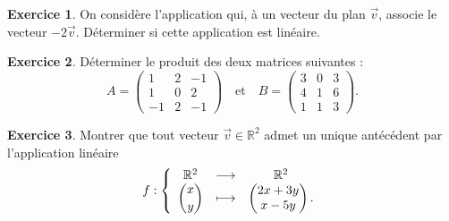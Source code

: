 \documentclass{article}
\theoremstyle{definition}
\newtheorem{exercice}{Exercice}
\begin{document}
\begin{exercice}
    On considère l'application qui, à un vecteur du plan $\vec{v}$, associe le vecteur $-2\vec{v}$. Déterminer si cette application est linéaire.
\end{exercice}

\begin{exercice}
  Déterminer le produit des deux matrices suivantes :
  \[
    A
    =
    \begin{pmatrix}
      1 & 2 & -1 \\
      1 & 0 & 2 \\
      -1 & 2 & -1
    \end{pmatrix}
    \quad\text{et}\quad
    B
    =
    \begin{pmatrix}
      3 & 0 & 3 \\
      4 & 1 & 6 \\
      1 & 1 & 3
    \end{pmatrix}.
  \]
\end{exercice}

\begin{exercice}
  Montrer que tout vecteur $\vec{v}\in \mathbb{R}^2$ admet un unique antécédent par l'application linéaire
    \begin{equation*}
      f : \left \{
        \begin{array}{ccc}
          \mathbb{R}^2 &\longrightarrow &\mathbb{R}^2\\
          \dbinom{x}{y} &\longmapsto &
          \begin{pmatrix}
            2x + 3y \\
            x - 5y
          \end{pmatrix}.
        \end{array} \right.
      \end{equation*}
\end{exercice}
\end{document}
